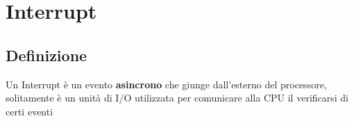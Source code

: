 \chapter{Interrupt}

\section{Definizione}
Un Interrupt è un evento \textbf{asincrono} che giunge dall'esterno del processore, solitamente è un unità di I/O utilizzata per comunicare alla CPU il verificarsi di certi eventi


